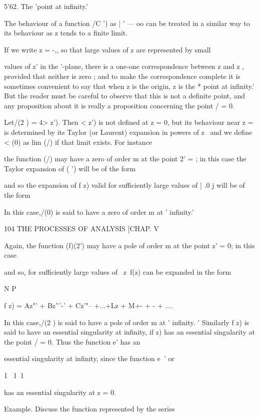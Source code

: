 {{{{5'62. The 'point at infinity.' 

The behaviour of a function /C ') as |   ' —   oo can be treated in a similar 
way to its behaviour as z tends to a finite limit. 

If we write z = -,, so that large values of z are represented by small 

values of z' in the  '-plane, there is a one-one correspondence between 
z and z , provided that neither is zero ; and to make the correspondence 
complete it is sometimes convenient to say that when z is the origin, z is 
the * point at infinity.' But the reader must be careful to observe that this 
is not a definite point, and any proposition about it is really a proposition 
concerning the point / = 0. 

Let/(2 ) = 4> z'). Then <  z') is not defined at z = 0, but its behaviour 
near z = is determined by its Taylor (or Laurent) expansion in powers 
of z \ and we define < (0) as lim   (/) if that limit exists. For instance 

the function (/) may have a zero of order m at the point 2' = ; in this 
case the Taylor expansion of  ( ') will be of the form 

and so the expansion of f z) valid for sufficiently large values of | .0 j will be 
of the form 

In this case,/(0) is said to have a zero of order m at ' infinity.' 



104 THE PROCESSES OF ANALYSIS [CHAP. V 

Again, the function (f)(2') may have a pole of order m at the point z' = 0; 
in this case 

and so, for sufficiently large values of \ z\, f(z) can be expanded in the form 

N P 

f z) = Az"' + Bz'''-' + Cz'"-- +...+Lz + M+- + - + .... 

In this case,/(2 ) is said to have a pole of order m at ' infinity. ' 
Similarly f z) is said to have an essential singularity at infinity, if    z) 
has an essential singularity at the point / = 0. Thus the function e' has an 

essential singularity at infinity, since the function e~' or 

1 \ 1\  1 

has an essential singularity at z = 0. 

Example. Discuss the function represented by the series 

}}}}
